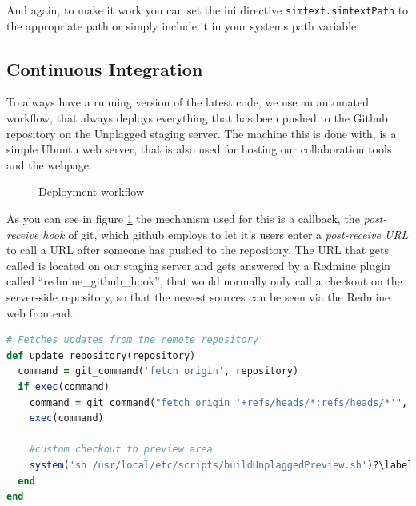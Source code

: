 And again, to make it work you can set the ini directive \texttt{simtext.simtextPath} to the appropriate path or simply
include it in your systems path variable.

\subsection{Continuous Integration}\label{sec:continuousIntegration}

To always have a running version of the latest code, we use an automated workflow, that always deploys everything that 
has been pushed to the Github repository on the Unplagged staging server. The machine this is done with, is a simple 
Ubuntu web server, that is also used for hosting our collaboration tools and the webpage.

\begin{figure}[!h]
  \centering
  \caption{Deployment workflow}
  \label{fig:developmentWorkflow}
\end{figure}

As you can see in figure \ref{fig:developmentWorkflow} the mechanism used for this is a callback, the 
\textit{post-receive hook} of git, 
which github employs to let it's users enter a \textit{post-receive URL} to call a URL after someone has pushed to the
repository. The URL that gets called is located on our staging server and gets answered by a Redmine plugin called 
\enquote{redmine\_github\_hook}, that would
normally only call a checkout on the server-side repository, so that the newest sources can be seen via the Redmine
web frontend. 

\begin{lstlisting}[caption=Changes to redmine\_github\_hook.rb, label=list:redmineGithubHook, language=Ruby]
# Fetches updates from the remote repository
def update_repository(repository)
  command = git_command('fetch origin', repository)
  if exec(command)
    command = git_command("fetch origin '+refs/heads/*:refs/heads/*'", repository)
    exec(command)

    #custom checkout to preview area
    system('sh /usr/local/etc/scripts/buildUnplaggedPreview.sh')?\label{customRubyChange}?
  end
end
\end{lstlisting}


